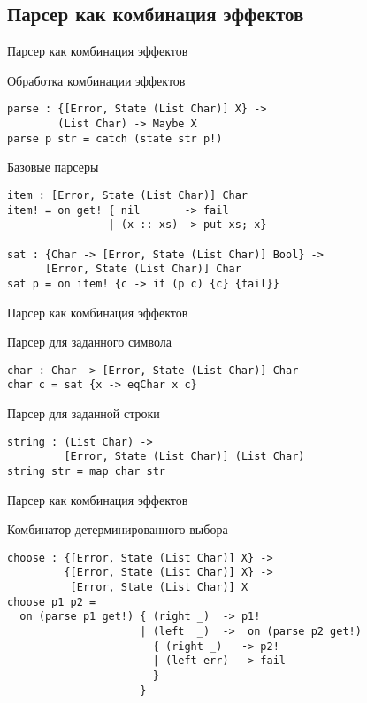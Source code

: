 \subsection{Парсер как комбинация эффектов}

\begin{frame}[fragile]{Парсер как комбинация эффектов}

\begin{block}{Обработка комбинации эффектов}
\begin{verbatim}
parse : {[Error, State (List Char)] X} ->
        (List Char) -> Maybe X
parse p str = catch (state str p!)
\end{verbatim}
\end{block}

\pause

\begin{block}{Базовые парсеры}
\begin{verbatim}
item : [Error, State (List Char)] Char
item! = on get! { nil       -> fail
                | (x :: xs) -> put xs; x}

sat : {Char -> [Error, State (List Char)] Bool} ->
      [Error, State (List Char)] Char
sat p = on item! {c -> if (p c) {c} {fail}}
\end{verbatim}
\end{block}
\end{frame}

\begin{frame}[fragile]{Парсер как комбинация эффектов}
\begin{block}{Парсер для заданного символа}
\begin{verbatim}
char : Char -> [Error, State (List Char)] Char
char c = sat {x -> eqChar x c}
\end{verbatim}
\end{block}

\begin{block}{Парсер для заданной строки}
\begin{verbatim}
string : (List Char) ->
         [Error, State (List Char)] (List Char)
string str = map char str
\end{verbatim}
\end{block}
\end{frame}

\begin{frame}[fragile]{Парсер как комбинация эффектов}
\begin{block}{Комбинатор детерминированного выбора}
\begin{verbatim}
choose : {[Error, State (List Char)] X} ->
         {[Error, State (List Char)] X} ->
          [Error, State (List Char)] X
choose p1 p2 =
  on (parse p1 get!) { (right _)  -> p1!
                     | (left  _)  ->  on (parse p2 get!)
                       { (right _)   -> p2!
                       | (left err)  -> fail
                       }
                     }
\end{verbatim}
\end{block}
\end{frame}


